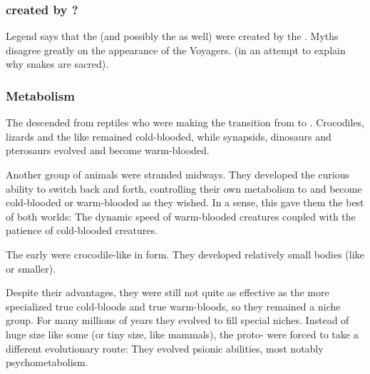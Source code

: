 \subsubsection{\Ophidians created by \voyagers?}
Legend says that the \caisith (and possibly the \nephilim as well) were created by the \voyagers. 
Myths disagree greatly on the appearance of the Voyagers. 
 (in an attempt to explain why snakes are sacred).





\subsubsection{Metabolism}
The \ophidians{} descended from reptiles who were making the transition from  to . 
Crocodiles, lizards and the like remained cold-blooded, while synapsids, dinosaurs and pterosaurs evolved and become warm-blooded. 

Another group of animals were stranded midways. 
They developed the curious ability to switch back and forth, controlling their own metabolism to  and become cold-blooded or warm-blooded as they wished. 
In a sense, this gave them the best of both worlds: 
The dynamic speed of warm-blooded creatures coupled with the patience of cold-blooded creatures. 


The early \ophidians{} were crocodile-like in form. 
They developed relatively small bodies (like \humans or smaller). 

Despite their advantages, they were still not quite as effective as the more specialized true cold-bloods and true warm-bloods, so they remained a niche group. 
For many millions of years they evolved to fill special niches. 
Instead of huge size like some \saurians{} (or tiny size, like mammals), the proto-\ophidians{} were forced to take a different evolutionary route: 
They evolved psionic abilities, most notably psychometabolism. 

